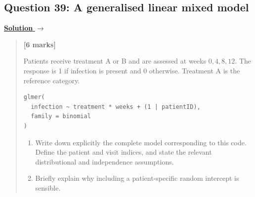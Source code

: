 \documentclass[11pt,a4paper]{article}
\newenvironment{examquestion}[2]
  {\subsection{#1}\label{question:\arabic{subsection}}\label{#2}%
   \noindent\hyperref[answer:\arabic{subsection}]{\textbf{Solution} $\rightarrow$}%
   \begin{quote}\color{statgrey}}
  {\end{quote}}
\begin{document}
\begin{examquestion}{Question 39: A generalised linear mixed model}{question:practice-a-generalised-linear-mixed-model}
\textbf{[6 marks]}

Patients receive treatment A or B and are assessed at weeks $0,4,8,12$.
The response is 1 if infection is present and 0 otherwise. Treatment A is
the reference category.
\begin{verbatim}
glmer(
  infection ~ treatment * weeks + (1 | patientID),
  family = binomial
)
\end{verbatim}
\begin{enumerate}[label=(\alph*)]
  \item Write down explicitly the complete model corresponding to this
        code. Define the patient and visit indices, and state the relevant
        distributional and independence assumptions.
  \item Briefly explain why including a patient-specific random intercept
        is sensible.
\end{enumerate}
\end{examquestion}

\clearpage
\end{document}
